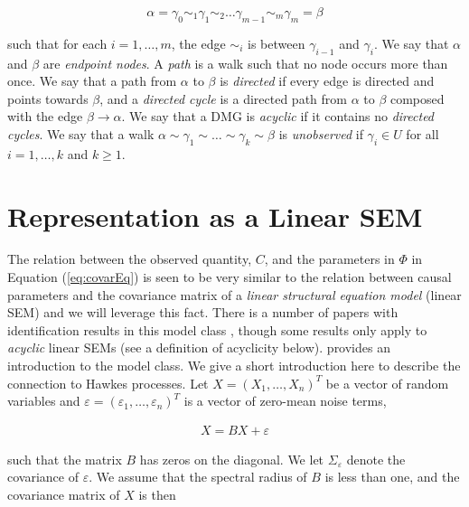 \documentclass[accepted]{uai2021} %
\begin{document}
$$
\alpha = \gamma_0 \sim_1 \gamma_1 \sim_2 \ldots \gamma_{m-1} \sim_m \gamma_{m} 
= \beta
$$

such that for each $i = 1,\ldots,m$, the edge $\sim_i$ is between 
$\gamma_{i-1}$ and $\gamma_i$. We say that $\alpha$ and $\beta$ are 
\emph{endpoint nodes}. A {\it path} is a walk such that no node occurs 
more than once. We say that a path from $\alpha$ to $\beta$ is \emph{directed} 
if every edge is directed and points towards $\beta$, and a \emph{directed 
cycle} is a directed path from $\alpha$ to $\beta$ composed with the edge 
$\beta\rightarrow\alpha$. We say that a DMG is \emph{acyclic} if it contains no 
\emph{directed cycles}. We say that a walk $\alpha \sim \gamma_1 \sim \ldots 
\sim 
\gamma_k \sim \beta$ is \emph{unobserved} if $\gamma_i \in U$ for all $i = 
1,\ldots, k$ and $k \geq 1$. 



\section{Representation as a Linear SEM}

The relation between the observed quantity, $C$, and the parameters in $\Phi$ 
in 
Equation (\ref{eq:covarEq}) is seen to be very similar to the relation between 
causal parameters and the covariance matrix of a \emph{linear structural 
	equation model} (linear SEM) and we will leverage this fact. 
There is 
a number of papers with 
identification results in this model class \citep{brito2002, tian2007, 
	tian2009, 
	foygelHalftrek2012, 
	chenNIPS2016, drton2016, 
	weihs2018}, though some results only apply to \emph{acyclic} linear SEMs 
	(see a 
definition of acyclicity below). \cite{bollen1989} provides an introduction to 
the model class. We give a short introduction here to describe the connection 
to 
Hawkes processes. Let $X = (X_1,\ldots,X_n)^T$ be a vector of random variables 
and 
$\varepsilon = 
(\varepsilon_1,\ldots,\varepsilon_n)^T$ is a vector of zero-mean noise terms,

\begin{align}
X = BX + \varepsilon
\label{eq:SEM}
\end{align}

such that the matrix $B$ has zeros on the diagonal. We let $\Sigma_\varepsilon$ 
denote the covariance of $\varepsilon$. We assume that the spectral radius of 
$B$ is less than one, and the
covariance matrix of $X$ is then
\end{document}
